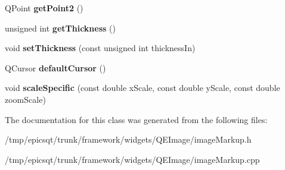 \begin{DoxyCompactItemize}
\item 
\hypertarget{classmarkupTarget_a11183bfd70670de5c47f68b49a27c263}{
QPoint {\bfseries getPoint2} ()}
\label{classmarkupTarget_a11183bfd70670de5c47f68b49a27c263}

\item 
\hypertarget{classmarkupTarget_a0e1ccd644b853568b20c33afabd0b318}{
unsigned int {\bfseries getThickness} ()}
\label{classmarkupTarget_a0e1ccd644b853568b20c33afabd0b318}

\item 
\hypertarget{classmarkupTarget_a67888ae75a085edda05a1324498e8559}{
void {\bfseries setThickness} (const unsigned int thicknessIn)}
\label{classmarkupTarget_a67888ae75a085edda05a1324498e8559}

\item 
\hypertarget{classmarkupTarget_af02852e493c9470f94240ed80027c752}{
QCursor {\bfseries defaultCursor} ()}
\label{classmarkupTarget_af02852e493c9470f94240ed80027c752}

\item 
\hypertarget{classmarkupTarget_a557cafc31fac39d5be8a825abc793a00}{
void {\bfseries scaleSpecific} (const double xScale, const double yScale, const double zoomScale)}
\label{classmarkupTarget_a557cafc31fac39d5be8a825abc793a00}

\end{DoxyCompactItemize}


The documentation for this class was generated from the following files:\begin{DoxyCompactItemize}
\item 
/tmp/epicsqt/trunk/framework/widgets/QEImage/imageMarkup.h\item 
/tmp/epicsqt/trunk/framework/widgets/QEImage/imageMarkup.cpp\end{DoxyCompactItemize}
